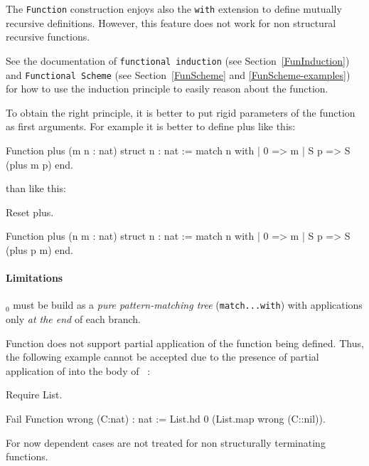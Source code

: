 The {\tt Function} construction enjoys also the {\tt with} extension
to define mutually recursive definitions. However, this feature does
not work for non structural recursive functions. %

See the documentation of {\tt functional induction}
(see Section~\ref{FunInduction}) and {\tt Functional Scheme}
(see Section~\ref{FunScheme} and \ref{FunScheme-examples}) for how to use the
induction principle to easily reason about the function.

 To obtain the right principle, it is better
to put rigid parameters of the function as first arguments. For
example it is better to define plus like this:

\begin{coq_example*}
Function plus (m n : nat) {struct n} : nat :=
  match n with
  | 0 => m
  | S p => S (plus m p)
  end.
\end{coq_example*}
\noindent than like this:
\begin{coq_eval}
Reset plus.
\end{coq_eval}
\begin{coq_example*}
Function plus (n m : nat) {struct n} : nat :=
  match n with
  | 0 => m
  | S p => S (plus p m)
  end.
\end{coq_example*}

\paragraph[Limitations]{Limitations\label{sec:Function-limitations}}
\term$_0$ must be build as a \emph{pure pattern-matching tree}
(\texttt{match...with}) with applications only \emph{at the end} of
each branch.  

Function does not support partial application of the function being defined. Thus, the following example cannot be accepted due to the presence of partial application of  into the body of ~:
\begin{coq_eval}
Require List.
\end{coq_eval}
\begin{coq_example*}
Fail Function wrong (C:nat) : nat :=
  List.hd 0 (List.map wrong (C::nil)).
\end{coq_example*}

For now dependent cases are not treated for non structurally terminating functions.



